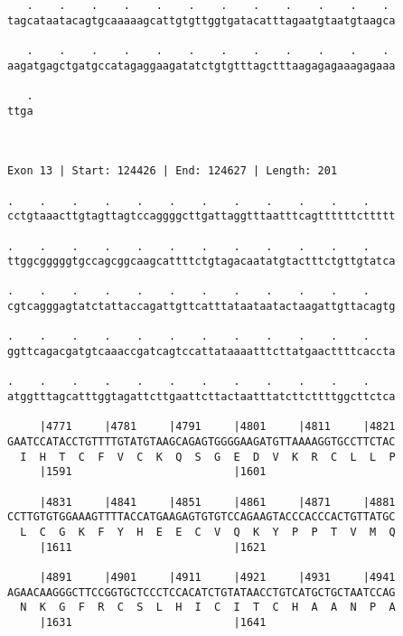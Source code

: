 \documentclass{article}
\begin{document}
\begin{Verbatim}
   .    .    .    .    .    .    .    .    .    .    .    . 
tagcataatacagtgcaaaaagcattgtgttggtgatacatttagaatgtaatgtaagca
                                                            
   .    .    .    .    .    .    .    .    .    .    .    . 
aagatgagctgatgccatagaggaagatatctgtgtttagctttaagagagaaagagaaa
                                                            
   .
ttga
    
    
 
Exon 13 | Start: 124426 | End: 124627 | Length: 201
 
.    .    .    .    .    .    .    .    .    .    .    .    
cctgtaaacttgtagttagtccaggggcttgattaggtttaatttcagttttttcttttt
                                                            
.    .    .    .    .    .    .    .    .    .    .    .    
ttggcgggggtgccagcggcaagcattttctgtagacaatatgtactttctgttgtatca
                                                            
.    .    .    .    .    .    .    .    .    .    .    .    
cgtcagggagtatctattaccagattgttcatttataataatactaagattgttacagtg
                                                            
.    .    .    .    .    .    .    .    .    .    .    .    
ggttcagacgatgtcaaaccgatcagtccattataaaatttcttatgaacttttcaccta
                                                            
.    .    .    .    .    .    .    .    .    .    .    .    
atggtttagcatttggtagattcttgaattcttactaatttatcttcttttggcttctca
                                                            
     |4771     |4781     |4791     |4801     |4811     |4821
GAATCCATACCTGTTTTGTATGTAAGCAGAGTGGGGAAGATGTTAAAAGGTGCCTTCTAC
  I  H  T  C  F  V  C  K  Q  S  G  E  D  V  K  R  C  L  L  P
     |1591                         |1601                    
  
     |4831     |4841     |4851     |4861     |4871     |4881
CCTTGTGTGGAAAGTTTTACCATGAAGAGTGTGTCCAGAAGTACCCACCCACTGTTATGC
  L  C  G  K  F  Y  H  E  E  C  V  Q  K  Y  P  P  T  V  M  Q
     |1611                         |1621                    
  
     |4891     |4901     |4911     |4921     |4931     |4941
AGAACAAGGGCTTCCGGTGCTCCCTCCACATCTGTATAACCTGTCATGCTGCTAATCCAG
  N  K  G  F  R  C  S  L  H  I  C  I  T  C  H  A  A  N  P  A
     |1631                         |1641                    
  

\end{Verbatim}
\end{document}
